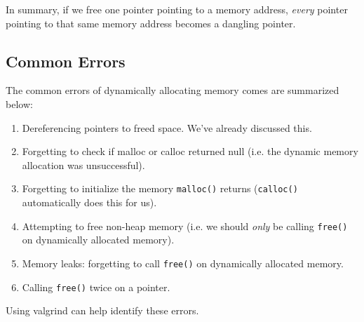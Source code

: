 \begin{center}

\end{center}

In summary, if we free one pointer pointing to a memory address, \textit{every} pointer pointing to that same memory address becomes a dangling pointer.  \\

\subsection{Common Errors}
The common errors of dynamically allocating memory comes are summarized below: \begin{enumerate}
    \item Dereferencing pointers to freed space. We've already discussed this.
    \item Forgetting to check if malloc or calloc returned null (i.e. the dynamic memory allocation was unsuccessful).
    \item Forgetting to initialize the memory \verb!malloc()! returns (\verb!calloc()! automatically does this for us).
    \item Attempting to free non-heap memory (i.e. we should \textit{only} be calling \verb!free()! on dynamically allocated memory). 
    \item Memory leaks: forgetting to call \verb!free()! on dynamically allocated memory. 
    \item Calling \verb!free()! twice on a pointer. 
\end{enumerate}


Using valgrind can help identify these errors.







